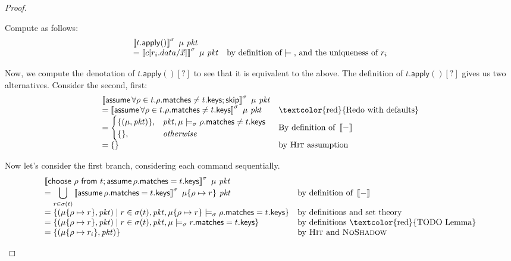 \documentclass{article}
\newcommand{\pkt}{\mathit{pkt}}
\newcommand{\denote}[1]{\left\llbracket#1\right\rrbracket}
\newcommand{\matches}{\mathsf{matches}}
\newcommand{\keys}{\mathsf{keys}}
\newcommand{\assume}{\mathop{\mathsf{assume}}}
\newcommand{\apply}{\mathsf{apply}}
\renewcommand{\choose}[2]{\mathsf{choose}~#1~\mathsf{from}~#2}
\newcommand{\SKIP}{\mathsf{skip}}
\begin{document}
\begin{proof}
\begin{enumerate}[align=left]
\begin{enumerate}
      Compute as follows:
      \[\begin{array}{>{\displaystyle}ll}
      \denote{t.\apply()}^\sigma~\mu~\pkt \\
      = \denote{c[r_i.data/\vec x]}^\sigma~\mu~\pkt & \text{by definition of} \models \text{, and the uniqueness of }r_i  \\
      \end{array}
      \]

      Now, we compute the denotation of $t.\apply()[?]$ to see that it is equivalent to the above.
      The definition of $t.\apply()[?]$ gives us two alternatives. Consider the second, first:
      \[\begin{array}{>{\displaystyle}ll}
        \denote{\assume \forall \rho \in t. \rho.\matches \neq t.\keys;\SKIP}^\sigma~\mu~\pkt \\
        = \denote{\assume \forall \rho \in t. \rho.\matches \neq t.\keys}^\sigma~\mu~\pkt
        & \textrm{\textcolor{red}{Redo with defaults}} \\
        = \begin{cases}
          \{(\mu,\pkt)\}, & \pkt,\mu \models_\sigma \rho.\matches \neq t.\keys \\
          \{\}, &\textit{otherwise}
        \end{cases}
        & \textrm{By definition of }\denote{-}\\
        =  \{\}
        & \textrm{by \textsc{Hit} assumption}
      \end{array}
      \]

      Now let's consider the first branch, considering each command sequentially.
      \[\begin{array}{>{\displaystyle}ll}
      \denote{\choose \rho t; \assume \rho.\matches = t.\keys}^\sigma~\mu~\pkt \\
      = \bigcup_{r \in \sigma(t)}\denote{\assume\rho.\matches = t.\keys}^\sigma~\mu\{\rho \mapsto r\}~\pkt
      & \textrm{by definition of }\denote{-}\\
      = \{(\mu\{\rho\mapsto r\},\pkt)
      \mid r \in \sigma(t), \pkt,\mu\{\rho\mapsto r\} \models_\sigma \rho.\matches = t.\keys
      \}
      & \textrm{by definitions and set theory} \\
      = \{(\mu\{\rho \mapsto r\}, \pkt)
      \mid r \in \sigma(t), \pkt,\mu \models_\sigma r.\matches = t.\keys\}
      & \textrm{by definitions \textcolor{red}{TODO Lemma}} \\
      = \{(\mu\{\rho \mapsto r_i\}, \pkt)\}
      & \textrm{by \textsc{Hit} and \textsc{NoShadow}} \\
      \end{array}\]


\end{enumerate}
\end{enumerate}
\end{proof}
\end{document}
